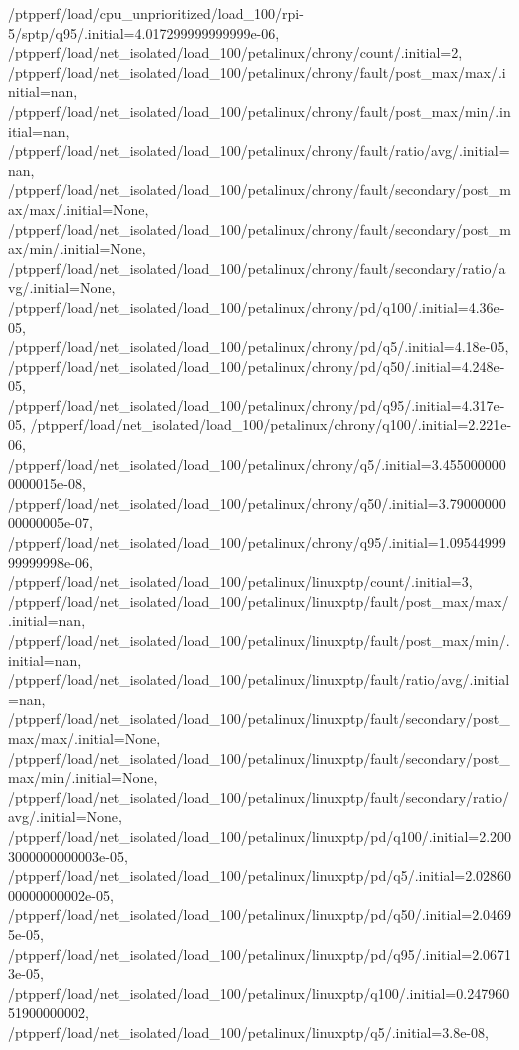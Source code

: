 {    /ptpperf/load/cpu_unprioritized/load_100/rpi-5/sptp/q95/.initial=4.017299999999999e-06,
    /ptpperf/load/net_isolated/load_100/petalinux/chrony/count/.initial=2,
    /ptpperf/load/net_isolated/load_100/petalinux/chrony/fault/post_max/max/.initial=nan,
    /ptpperf/load/net_isolated/load_100/petalinux/chrony/fault/post_max/min/.initial=nan,
    /ptpperf/load/net_isolated/load_100/petalinux/chrony/fault/ratio/avg/.initial=nan,
    /ptpperf/load/net_isolated/load_100/petalinux/chrony/fault/secondary/post_max/max/.initial=None,
    /ptpperf/load/net_isolated/load_100/petalinux/chrony/fault/secondary/post_max/min/.initial=None,
    /ptpperf/load/net_isolated/load_100/petalinux/chrony/fault/secondary/ratio/avg/.initial=None,
    /ptpperf/load/net_isolated/load_100/petalinux/chrony/pd/q100/.initial=4.36e-05,
    /ptpperf/load/net_isolated/load_100/petalinux/chrony/pd/q5/.initial=4.18e-05,
    /ptpperf/load/net_isolated/load_100/petalinux/chrony/pd/q50/.initial=4.248e-05,
    /ptpperf/load/net_isolated/load_100/petalinux/chrony/pd/q95/.initial=4.317e-05,
    /ptpperf/load/net_isolated/load_100/petalinux/chrony/q100/.initial=2.221e-06,
    /ptpperf/load/net_isolated/load_100/petalinux/chrony/q5/.initial=3.4550000000000015e-08,
    /ptpperf/load/net_isolated/load_100/petalinux/chrony/q50/.initial=3.7900000000000005e-07,
    /ptpperf/load/net_isolated/load_100/petalinux/chrony/q95/.initial=1.0954499999999998e-06,
    /ptpperf/load/net_isolated/load_100/petalinux/linuxptp/count/.initial=3,
    /ptpperf/load/net_isolated/load_100/petalinux/linuxptp/fault/post_max/max/.initial=nan,
    /ptpperf/load/net_isolated/load_100/petalinux/linuxptp/fault/post_max/min/.initial=nan,
    /ptpperf/load/net_isolated/load_100/petalinux/linuxptp/fault/ratio/avg/.initial=nan,
    /ptpperf/load/net_isolated/load_100/petalinux/linuxptp/fault/secondary/post_max/max/.initial=None,
    /ptpperf/load/net_isolated/load_100/petalinux/linuxptp/fault/secondary/post_max/min/.initial=None,
    /ptpperf/load/net_isolated/load_100/petalinux/linuxptp/fault/secondary/ratio/avg/.initial=None,
    /ptpperf/load/net_isolated/load_100/petalinux/linuxptp/pd/q100/.initial=2.2003000000000003e-05,
    /ptpperf/load/net_isolated/load_100/petalinux/linuxptp/pd/q5/.initial=2.0286000000000002e-05,
    /ptpperf/load/net_isolated/load_100/petalinux/linuxptp/pd/q50/.initial=2.04695e-05,
    /ptpperf/load/net_isolated/load_100/petalinux/linuxptp/pd/q95/.initial=2.06713e-05,
    /ptpperf/load/net_isolated/load_100/petalinux/linuxptp/q100/.initial=0.24796051900000002,
    /ptpperf/load/net_isolated/load_100/petalinux/linuxptp/q5/.initial=3.8e-08,
}
